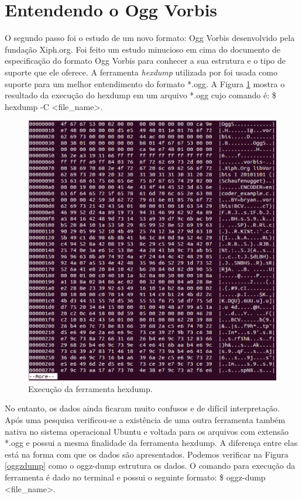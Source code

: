\section{Entendendo o Ogg Vorbis}

O segundo passo foi o estudo de um novo formato: Ogg Vorbis desenvolvido pela fundação Xiph.org. Foi feito um estudo minucioso em cima do documento de especificação do formato Ogg Vorbis para conhecer a sua estrutura e o tipo de suporte que ele oferece. A ferramenta \textit{hexdump} utilizada por \cite{herbert} foi usada como suporte para um melhor entendimento do formato *.ogg. A Figura \ref{hexdump} mostra o resultado da execução do hexdump em um arquivo *.ogg cujo comando é: \$ hexdump -C <file\_name>.

 \begin{figure}[ht]
	\centering
		\includegraphics[keepaspectratio=true,scale=0.5]{figuras/hexdump.eps}
	\caption{Execução da ferramenta hexdump.}
	\label{hexdump}
\end{figure}

No entanto, os dados ainda ficaram muito confusos e de difícil interpretação. Após uma pesquisa verificou-se a existência de uma outra ferramenta também nativa no sistema operacional Ubuntu e voltada para os arquivos com extensão *.ogg e possui a mesma finalidade da ferramenta hexdump. A diferença entre elas está na forma com que os dados são apresentados. Podemos verificar na Figura \ref{oggzdump} como o oggz-dump estrutura os dados. O comando para execução da ferramenta é dado no terminal e possui o seguinte formato: \$ oggz-dump <file\_name>.

